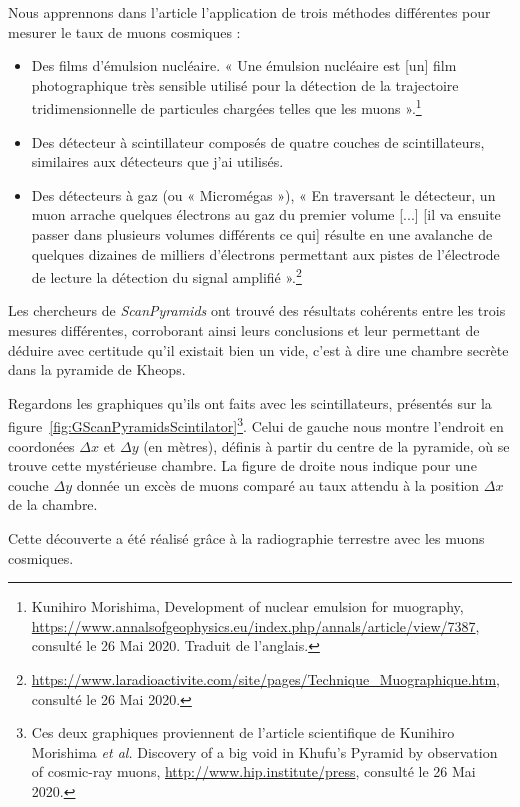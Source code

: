 \documentclass[a4paper, 12pt]{article}
\begin{document}
\begin{spacing}{1.5}
Nous apprennons dans l'article l'application de trois méthodes différentes pour mesurer le taux de muons cosmiques :
\begin{itemize}
  \item Des films d'émulsion nucléaire. « Une émulsion nucléaire est [un] film photographique très sensible utilisé pour la détection de la trajectoire tridimensionnelle de particules chargées telles que les muons ».\footnote{Kunihiro Morishima, Development of nuclear emulsion for muography, \url{https://www.annalsofgeophysics.eu/index.php/annals/article/view/7387}, consulté le 26 Mai 2020. Traduit de l'anglais.}
  \item Des détecteur à scintillateur composés de quatre couches de scintillateurs, similaires aux détecteurs que j'ai utilisés.
  \item Des détecteurs à gaz (ou « Micromégas »), « En traversant le détecteur, un muon arrache quelques électrons au gaz du premier volume [...] [il va ensuite passer dans plusieurs volumes différents ce qui]  résulte en une avalanche de quelques dizaines de milliers d'électrons permettant aux pistes de l’électrode de lecture la détection du signal amplifié ».\footnote{\url{https://www.laradioactivite.com/site/pages/Technique_Muographique.htm}, consulté le 26 Mai 2020.}
\end{itemize}

Les chercheurs de \emph{ScanPyramids} ont trouvé des résultats cohérents entre les trois mesures différentes, corroborant ainsi leurs conclusions et leur permettant de déduire avec certitude qu'il existait bien un vide, c'est à dire une chambre secrète dans la pyramide de Kheops.

Regardons les graphiques qu'ils ont faits avec les scintillateurs, présentés sur la figure~\ref{fig:GScanPyramidsScintilator}\footnote{Ces deux graphiques proviennent de l'article scientifique de Kunihiro Morishima \emph{et al.} Discovery of a big void in Khufu's Pyramid by observation of cosmic-ray muons, \url{http://www.hip.institute/press}, consulté le 26 Mai 2020.}. Celui de gauche nous montre l'endroit en coordonées $\Delta x$ et $\Delta y$ (en mètres), définis à partir du centre de la pyramide, où se trouve cette mystérieuse chambre. La figure de droite nous indique pour une couche $\Delta y$ donnée un excès de muons comparé au taux attendu à la position $\Delta x$ de la chambre.

Cette découverte a été réalisé grâce à la radiographie terrestre avec les muons cosmiques.


\end{spacing}
\end{document}
